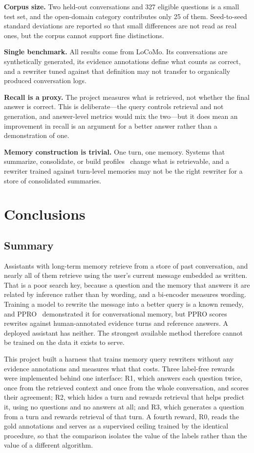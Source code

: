 \documentclass[12pt,letterpaper,oneside]{report}
\newcommand{\Rz}{R0}
\newcommand{\Ra}{R1}
\newcommand{\Rb}{R2}
\newcommand{\Rc}{R3}
\begin{document}
\textbf{Corpus size.} Two held-out conversations and 327 eligible questions is
a small test set, and the open-domain category contributes only 25 of them.
Seed-to-seed standard deviations are reported so that small differences are not
read as real ones, but the corpus cannot support fine distinctions.

\textbf{Single benchmark.} All results come from LoCoMo. Its conversations are
synthetically generated, its evidence annotations define what counts as
correct, and a rewriter tuned against that definition may not transfer to
organically produced conversation logs.

\textbf{Recall is a proxy.} The project measures what is retrieved, not whether
the final answer is correct. This is deliberate---the query controls retrieval
and not generation, and answer-level metrics would mix the two---but it does
mean an improvement in recall is an argument for a better answer rather than a
demonstration of one.

\textbf{Memory construction is trivial.} One turn, one memory. Systems that
summarize, consolidate, or build profiles~\cite{ppro,mem0,memorybank} change
what is retrievable, and a rewriter trained against turn-level memories may not
be the right rewriter for a store of consolidated summaries.

\chapter{Conclusions}
\label{ch:conclusions}

\section{Summary}
\label{sec:summary}

Assistants with long-term memory retrieve from a store of past conversation,
and nearly all of them retrieve using the user's current message embedded as
written. That is a poor search key, because a question and the memory that
answers it are related by inference rather than by wording, and a bi-encoder
measures wording. Training a model to rewrite the message into a better query
is a known remedy, and PPRO~\cite{ppro} demonstrated it for conversational
memory, but PPRO scores rewrites against human-annotated evidence turns and
reference answers. A deployed assistant has neither. The strongest available
method therefore cannot be trained on the data it exists to serve.

This project built a harness that trains memory query rewriters without any
evidence annotations and measures what that costs. Three label-free rewards
were implemented behind one interface: \Ra, which answers each question twice,
once from the retrieved context and once from the whole conversation, and
scores their agreement; \Rb, which hides a turn and rewards retrieval that
helps predict it, using no questions and no answers at all; and \Rc, which
generates a question from a turn and rewards retrieval of that turn. A fourth
reward, \Rz, reads the gold annotations and serves as a supervised ceiling
trained by the identical procedure, so that the comparison isolates the value
of the labels rather than the value of a different algorithm.
\end{document}
